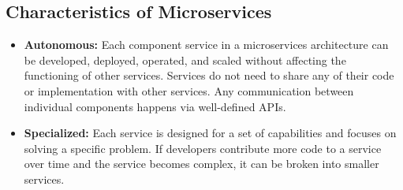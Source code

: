 \subsection{Characteristics of Microservices}
\begin{itemize}
    \item \textbf{Autonomous:} Each component service in a microservices architecture can be developed, deployed, operated, and scaled without affecting the functioning of other services. Services do not need to share any of their code or implementation with other services. Any communication between individual components happens via well-defined APIs.
    \item \textbf{Specialized:} Each service is designed for a set of capabilities and focuses on solving a specific problem. If developers contribute more code to a service over time and the service becomes complex, it can be broken into smaller services.
\end{itemize}

